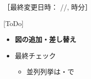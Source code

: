 ［最終変更日時：
{\the\year/\the\month/\the\day, {\the\hour} 時{\the\minute}分}］

 [ToDo]
\begin{itemize}
  \item \textbf{図の追加・差し替え}
  \item 最終チェック
  \begin{itemize}
    \item 並列列挙は・で
  \end{itemize}
\end{itemize}
